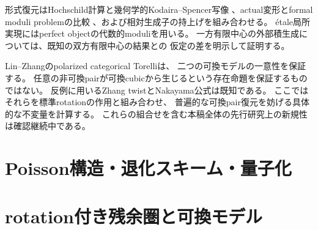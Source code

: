 形式復元はHochschild計算と幾何学的Kodaira--Spencer写像
\cite{BFK,HR,JLLZ}、actual変形とformal moduli problemの比較
\cite{Lurie,BKP}、および相対生成子の持上げ\cite{DDL}を組み合わせる。
étale局所実現にはperfect objectの代数的moduli\cite{TV}を用いる。
一方有限中心の外部積生成については、既知の双方有限中心の結果\cite{ELS}との
仮定の差を明示して証明する。

Lin--Zhangのpolarized categorical Torelli\cite[Theorem 1.7]{LZ}は、
二つの可換モデルの一意性を保証する。
任意の非可換pairが可換cubicから生じるという存在命題を保証するものではない。
反例に用いるZhang twistとNakayama公式は既知である\cite{ZhangTwist,RRZ}。
ここではそれらを標準rotationの作用\cite[Proposition 3.12]{Huy}と組み合わせ、
普遍的な可換pair復元を妨げる具体的な不変量を計算する。
これらの組合せを含む本稿全体の先行研究上の新規性は確認継続中である。

\part{Poisson構造・退化スキーム・量子化}


\part{rotation付き残余圏と可換モデル}





